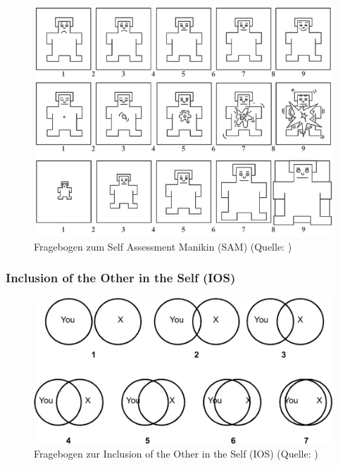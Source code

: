 \documentclass[
	12pt,
	a4paper,
	bibtotoc,
	cleardoubleempty, 
	idxtotoc,
	ngerman,
	openright
	final,
	listof=nochaptergap,
	]{scrbook}
\begin{document}
\begin{appendices}
\begin{figure}[ht]
\centering
\includegraphics[width=1\linewidth]{content/attachments/questtionaires/Self-Assessment-Manikin-SAM-for-valence-arousal-and-dominance-The-five.png}
\caption{Fragebogen zum Self Assessment Manikin (SAM) (Quelle: \citealp{soares_affective_2013})}
\label{fig:append_sam}
\end{figure}

\clearpage

\subsubsection{Inclusion of the Other in the Self (IOS)}\label{sec:append_study_ios}


\begin{figure}[ht]
\centering
\includegraphics[width=1\linewidth]{content/attachments/questtionaires/IOS.png}
\caption{Fragebogen zur Inclusion of the Other in the Self (IOS) (Quelle: \citealp{gachter_measuring_2015})}
\label{fig:append_ios}
\end{figure}




\end{appendices}
\end{document}
